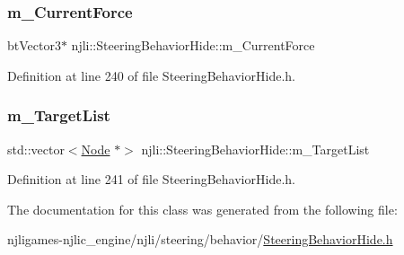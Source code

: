 \subsubsection{\texorpdfstring{m\+\_\+\+Current\+Force}{m\_CurrentForce}}
{\footnotesize\ttfamily bt\+Vector3$\ast$ njli\+::\+Steering\+Behavior\+Hide\+::m\+\_\+\+Current\+Force\hspace{0.3cm}{\ttfamily [private]}}



Definition at line 240 of file Steering\+Behavior\+Hide.\+h.

\mbox{\label{classnjli_1_1_steering_behavior_hide_a6932c0546c4373a1e0b3f7d877f8123c}} 
\subsubsection{\texorpdfstring{m\+\_\+\+Target\+List}{m\_TargetList}}
{\footnotesize\ttfamily std\+::vector$<$\mbox{\hyperlink{classnjli_1_1_node}{Node}} $\ast$$>$ njli\+::\+Steering\+Behavior\+Hide\+::m\+\_\+\+Target\+List\hspace{0.3cm}{\ttfamily [private]}}



Definition at line 241 of file Steering\+Behavior\+Hide.\+h.



The documentation for this class was generated from the following file\+:\begin{DoxyCompactItemize}
\item 
njligames-\/njlic\+\_\+engine/njli/steering/behavior/\mbox{\hyperlink{_steering_behavior_hide_8h}{Steering\+Behavior\+Hide.\+h}}\end{DoxyCompactItemize}
